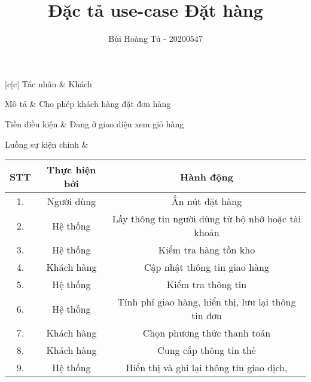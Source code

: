 \documentclass[]{report}
\title{Đặc tả use-case Đặt hàng }
\author{Bùi Hoàng Tú - 20200547 }
\date{}
\begin{document}
\maketitle

\begin{table}
	\centering
	\begin{tabular}{|c|c|}
		\hline
		Tác nhân
		& Khách \\
		\hline 
		
		Mô tả 
		& Cho phép khách hàng đặt đơn hàng \\
		\hline 
		
		Tiền điều kiện 
		& Đang ở giao diện xem giỏ hàng \\
		\hline
			
		Luồng sự kiện chính	
		& 	\begin{tabular}{|c|c|c|} 
				\firsthline 
				STT
				& Thực hiện bởi 
				& Hành động \\
				\hline 
				
				1. 
				& Người dùng 
				& Ấn nút đặt hàng \\
				\hline
				
				2.
				& Hệ thống 
				& Lấy thông tin người dùng từ bộ nhớ hoặc tài khoản \\
				\hline
				
				3.
				& Hệ thống 
				& Kiểm tra hàng tồn kho \\
				\hline
				
				4. 
				& Khách hàng 
				& Cập nhật  thông tin giao hàng \\	
				\hline
				
				5.
				& Hệ thống 
				& Kiểm tra thông tin \\
				\hline 
				
				6. 
				& Hệ thống 
				& Tính phí giao hàng, hiển thị, lưu lại thông tin đơn \\
				\hline
				
				7.
				& Khách hàng 
				& Chọn phương thức thanh toán \\
				\hline
				
				8.
				& Khách hàng
				& Cung cấp thông tin thẻ \\
				\hline 
				
				9.
				& Hệ thống 
				& Hiển thị và ghi lại thông tin giao dịch,  \\
				\hline
				
			\end{tabular} \\
			[15ex]
		\hline
		

\end{tabular}
\end{table}
\end{document}
